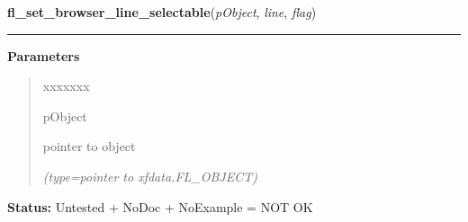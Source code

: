     \label{xformslib:library:fl_set_browser_line_selectable}

    \vspace{0.5ex}

\hspace{.8\funcindent}\begin{boxedminipage}{\funcwidth}

    \raggedright \textbf{fl\_set\_browser\_line\_selectable}(\textit{pObject}, \textit{line}, \textit{flag})

    \vspace{-1.5ex}

    \rule{\textwidth}{0.5\fboxrule}
\setlength{\parskip}{2ex}
\setlength{\parskip}{1ex}
      \textbf{Parameters}
      \vspace{-1ex}

      \begin{quote}
        \begin{Ventry}{xxxxxxx}

          \item[pObject]

          pointer to object

            {\it (type=pointer to xfdata.FL\_OBJECT)}

        \end{Ventry}

      \end{quote}

\textbf{Status:} Untested + NoDoc + NoExample = NOT OK



    \end{boxedminipage}

    \label{xformslib:library:fl_get_browser_dimension}

    \vspace{0.5ex}

